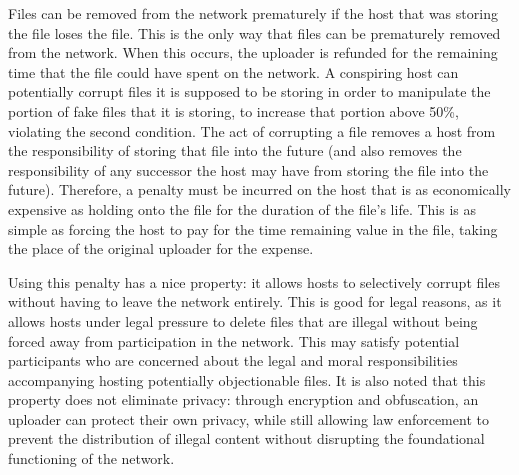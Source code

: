 \documentclass[twocolumn]{article}
\begin{document}
Files can be removed from the network prematurely if the host that was storing the file loses the file.
This is the only way that files can be prematurely removed from the network.
When this occurs, the uploader is refunded for the remaining time that the file could have spent on the network.
A conspiring host can potentially corrupt files it is supposed to be storing in order to manipulate the portion of fake files that it is storing, to increase that portion above 50\%, violating the second condition.
The act of corrupting a file removes a host from the responsibility of storing that file into the future (and also removes the responsibility of any successor the host may have from storing the file into the future).
Therefore, a penalty must be incurred on the host that is as economically expensive as holding onto the file for the duration of the file's life.
This is as simple as forcing the host to pay for the time remaining value in the file, taking the place of the original uploader for the expense.

Using this penalty has a nice property: it allows hosts to selectively corrupt files without having to leave the network entirely.
This is good for legal reasons, as it allows hosts under legal pressure to delete files that are illegal without being forced away from participation in the network.
This may satisfy potential participants who are concerned about the legal and moral responsibilities accompanying hosting potentially objectionable files.
It is also noted that this property does not eliminate privacy: through encryption and obfuscation, an uploader can protect their own privacy, while still allowing law enforcement to prevent the distribution of illegal content without disrupting the foundational functioning of the network.
\end{document}
